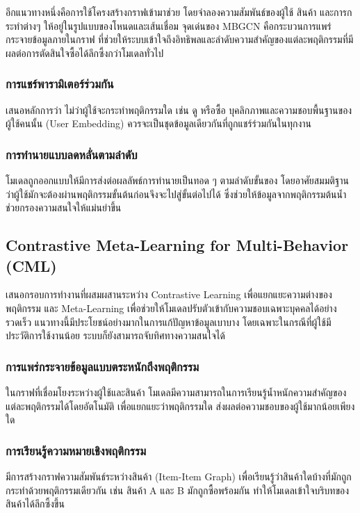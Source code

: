 อีกแนวทางหนึ่งคือการใช้โครงสร้างกราฟเข้ามาช่วย โดยจำลองความสัมพันธ์ของผู้ใช้ สินค้า และการกระทำต่างๆ ให้อยู่ในรูปแบบของโหนดและเส้นเชื่อม จุดเด่นของ MBGCN คือกระบวนการแพร่กระจายข้อมูลภายในกราฟ ที่ช่วยให้ระบบเข้าใจถึงอิทธิพลและลำดับความสำคัญของแต่ละพฤติกรรมที่มีผลต่อการตัดสินใจซื้อได้ลึกซึ้งกว่าโมเดลทั่วไป \cite{mbgcn_nd} 

\subsubsection{การแชร์พารามิเตอร์ร่วมกัน}
เสนอหลักการว่า ไม่ว่าผู้ใช้จะกระทำพฤติกรรมใด เช่น ดู หรือซื้อ บุคลิกภาพและความชอบพื้นฐานของผู้ใช้คนนั้น (User Embedding) ควรจะเป็นชุดข้อมูลเดียวกันที่ถูกแชร์ร่วมกันในทุกงาน

\subsubsection{การทำนายแบบลดหลั่นตามลำดับ}
โมเดลถูกออกแบบให้มีการส่งต่อผลลัพธ์การทำนายเป็นทอด ๆ ตามลำดับขั้นของ โดยอาศัยสมมติฐานว่าผู้ใช้มักจะต้องผ่านพฤติกรรมขั้นต้นก่อนจึงจะไปสู่ขั้นต่อไปได้ ซึ่งช่วยให้ข้อมูลจากพฤติกรรมต้นน้ำช่วยกรองความสนใจให้แม่นยำขึ้น

\subsection{Contrastive Meta-Learning for Multi-Behavior (CML)}

เสนอกรอบการทำงานที่ผสมผสานระหว่าง Contrastive Learning เพื่อแยกแยะความต่างของพฤติกรรม และ Meta-Learning เพื่อช่วยให้โมเดลปรับตัวเข้ากับความชอบเฉพาะบุคคลได้อย่างรวดเร็ว แนวทางนี้มีประโยชน์อย่างมากในการแก้ปัญหาข้อมูลเบาบาง โดยเฉพาะในกรณีที่ผู้ใช้มีประวัติการใช้งานน้อย ระบบก็ยังสามารถจับทิศทางความสนใจได้ \cite{wei2022} 

  
\subsubsection{การแพร่กระจายข้อมูลแบบตระหนักถึงพฤติกรรม}
ในกราฟที่เชื่อมโยงระหว่างผู้ใช้และสินค้า โมเดลมีความสามารถในการเรียนรู้น้ำหนักความสำคัญของแต่ละพฤติกรรมได้โดยอัตโนมัติ เพื่อแยกแยะว่าพฤติกรรมใด ส่งผลต่อความชอบของผู้ใช้มากน้อยเพียงใด

  
\subsubsection{การเรียนรู้ความหมายเชิงพฤติกรรม}
มีการสร้างกราฟความสัมพันธ์ระหว่างสินค้า (Item-Item Graph) เพื่อเรียนรู้ว่าสินค้าใดบ้างที่มักถูกกระทำด้วยพฤติกรรมเดียวกัน เช่น สินค้า A และ B มักถูกซื้อพร้อมกัน ทำให้โมเดลเข้าใจบริบทของสินค้าได้ลึกซึ้งขึ้น

